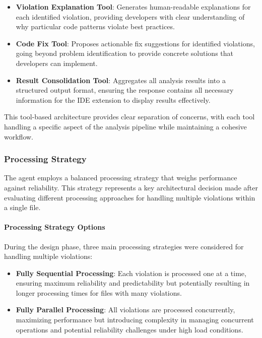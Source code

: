 \begin{spacing}{1.2}
\begin{itemize}
    \item \textbf{Violation Explanation Tool}: Generates human-readable explanations for each identified violation, providing developers with clear understanding of why particular code patterns violate best practices.
    
    \item \textbf{Code Fix Tool}: Proposes actionable fix suggestions for identified violations, going beyond problem identification to provide concrete solutions that developers can implement.
    
    \item \textbf{Result Consolidation Tool}: Aggregates all analysis results into a structured output format, ensuring the response contains all necessary information for the IDE extension to display results effectively.
\end{itemize}

This tool-based architecture provides clear separation of concerns, with each tool handling a specific aspect of the analysis pipeline while maintaining a cohesive workflow. 
\subsubsection{Processing Strategy}
The agent employs a balanced processing strategy that weighs performance against reliability. This strategy represents a key architectural decision made after evaluating different processing approaches for handling multiple violations within a single file.

\paragraph{Processing Strategy Options}
During the design phase, three main processing strategies were considered for handling multiple violations:

\begin{itemize}
    \item \textbf{Fully Sequential Processing}: Each violation is processed one at a time, ensuring maximum reliability and predictability but potentially resulting in longer processing times for files with many violations.
    
    \item \textbf{Fully Parallel Processing}: All violations are processed concurrently, maximizing performance but introducing complexity in managing concurrent operations and potential reliability challenges under high load conditions.
    

\end{itemize}
\end{spacing}
